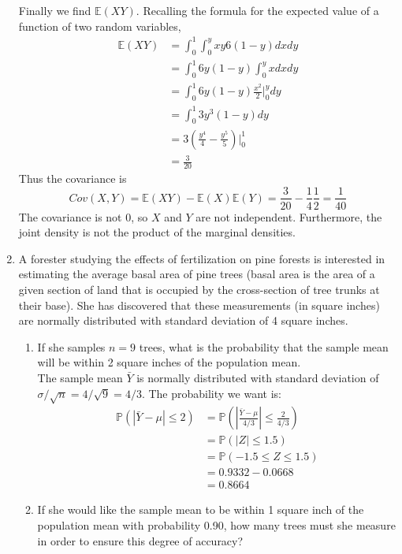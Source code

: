 \documentclass[12pt]{article}
\def\P{{\mathbb P}}
\def\E{{\mathbb E}}
\begin{document}
\begin{enumerate}
Finally we find $\E(XY)$. Recalling the formula for the expected value of a function of two random variables,
\begin{align*}
\E(XY) &= \int_0^1 \int_0^y xy 6(1-y) dx dy \\
&= \int_0^1 6y(1-y) \int_0^y x dx dy \\
&= \int_0^1 6y(1-y) \frac{x^2}{2}\Bigr|_0^y dy \\
&= \int_0^1 3y^3(1-y) dy \\
&= 3 \left(\frac{y^4}{4} - \frac{y^5}{5} \right) \Bigr|_0^1 \\
&= \frac{3}{20}
\end{align*}
Thus the covariance is
\[
Cov(X, Y) = \E(XY) - \E(X)\E(Y) = \frac{3}{20} - \frac{1}{4}\frac{1}{2} = \frac{1}{40}
\]
The covariance is not 0, so $X$ and $Y$ are not independent. Furthermore, the joint density is not the product of the marginal densities.

\item A forester studying the effects of fertilization on pine forests is interested in estimating the average basal area of pine trees (basal area is the area of a given section of land that is occupied by the cross-section of tree trunks at their base). She has discovered that these measurements (in square inches) are normally distributed with standard deviation of 4 square inches.
\begin{enumerate}
\item If she samples $n = 9$ trees, what is the probability that the sample mean will be within 2 square inches of the population mean.\\

The sample mean $\bar{Y}$ is normally distributed with standard deviation of $\sigma / \sqrt{n} = 4 / \sqrt{9} = 4 / 3$. The probability we want is:
\begin{align*}
\P(|\bar{Y} - \mu| \leq 2) &= \P \left( \left| \frac{ \bar{Y} - \mu }{ 4/3 } \right| \leq \frac{2}{4/3} \right) \\
&= \P(\left|Z\right| \leq 1.5) \\
&= \P( -1.5 \leq Z \leq 1.5) \\
&= 0.9332 - 0.0668 \\
&= 0.8664
\end{align*}

\item If she would like the sample mean to be within 1 square inch of the population mean with probability 0.90, how many trees must she measure in order to ensure this degree of accuracy?\\


\end{enumerate}
\end{enumerate}
\end{document}
